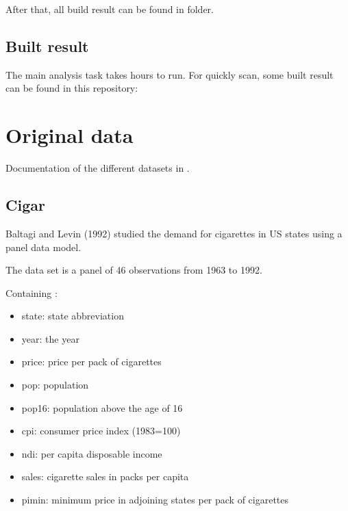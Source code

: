 \documentclass[a4paper,11pt,english]{sphinxmanual}
\begin{document}
\sphinxAtStartPar
After that, all build result can be found in  folder.


\section{Built result}
\label{\detokenize{introduction:built-result}}\label{\detokenize{introduction:id4}}
\sphinxAtStartPar
The main analysis task takes hours to run. For quickly scan, some built result can be found in this repository:


\chapter{Original data}
\label{\detokenize{original_data:original-data}}\label{\detokenize{original_data:id1}}\label{\detokenize{original_data::doc}}
\sphinxAtStartPar
Documentation of the different datasets in .


\section{Cigar}
\label{\detokenize{original_data:cigar}}
\sphinxAtStartPar
Baltagi and Levin (1992) studied the demand for cigarettes in US states using a panel data model.

\sphinxAtStartPar
The data set is a panel of 46 observations from 1963 to 1992.

\sphinxAtStartPar
Containing :
\begin{itemize}
\item {} 
\sphinxAtStartPar
state: state abbreviation

\item {} 
\sphinxAtStartPar
year: the year

\item {} 
\sphinxAtStartPar
price: price per pack of cigarettes

\item {} 
\sphinxAtStartPar
pop: population

\item {} 
\sphinxAtStartPar
pop16: population above the age of 16

\item {} 
\sphinxAtStartPar
cpi: consumer price index (1983=100)

\item {} 
\sphinxAtStartPar
ndi: per capita disposable income

\item {} 
\sphinxAtStartPar
sales: cigarette sales in packs per capita

\item {} 
\sphinxAtStartPar
pimin: minimum price in adjoining states per pack of cigarettes

\end{itemize}
\end{document}
